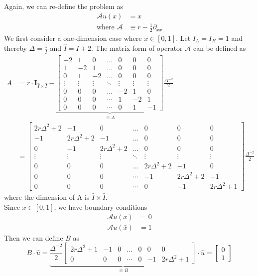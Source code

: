 \documentclass[11pt]{article}
\newcommand{\A}{\ensuremath{\mathcal{A}}}
\begin{document}
Again, we can re-define the problem as 
\begin{align}
\A u(x) &= x\label{HJBE_lower_absorbing_barriers_PDE}\\
\text{where }\A&\equiv r - \frac{1}{2}\partial_{xx}
\end{align}
We first consider a one-dimension case where $x\in [0, 1]$. Let $I_L = I_H = 1$ and thereby $\Delta  = \frac{1}{\bar{I}}$ and $\hat{I} = I+2$. The matrix form of operator $\A$ can be defined as
\begin{align}
A &= r\cdot \mathbf{I}_{\hat{I}\times\hat{I}}-\underbrace{\begin{bmatrix}
-2&1&0&\dots&0&0&0\\
1&-2&1&\dots&0&0&0\\
0&1&-2&\dots&0&0&0\\
\vdots&\vdots&\vdots&\ddots&\vdots&\vdots&\vdots\\
0&0&0&\dots&-2&1&0\\
0&0&0&\cdots&1&-2&1\\
0&0&0&\cdots&0&1&-1
\end{bmatrix}}_{\equiv A}\frac{\Delta^{-2}}{2}\nonumber\\
&=
\begin{bmatrix}
2r\Delta^2+2&-1&0&\dots&0&0&0\\
-1&2r\Delta^2+2&-1&\dots&0&0&0\\
0&-1&2r\Delta^2+2&\dots&0&0&0\\
\vdots&\vdots&\vdots&\ddots&\vdots&\vdots&\vdots\\
0&0&0&\dots&2r\Delta^2+2&-1&0\\
0&0&0&\cdots&-1&2r\Delta^2+2&-1\\
0&0&0&\cdots&0&-1&2r\Delta^2+1
\end{bmatrix}\frac{\Delta^{-2}}{2}
\end{align}
where the dimension of A is $\hat{I}\times\hat{I}$.\\
Since $x\in[0, 1]$, we have boundary conditions 
\begin{align}
\A u(\underline{x}) &= 0\\
\A u(\bar{x})& = 1
\end{align}
Then we can define $B$ as
\begin{equation}
B\cdot\hat{u} =\underbrace{\frac{\Delta^{-2}}{2}\begin{bmatrix}
2r\Delta^2+1&-1&0&\dots&0&0&0\\
0&0&0&\cdots&0&-1&2r\Delta^2+1
\end{bmatrix}}_{\equiv B}\cdot\hat{u} = \begin{bmatrix}
0\\
1
\end{bmatrix}
\end{equation}
\end{document}
